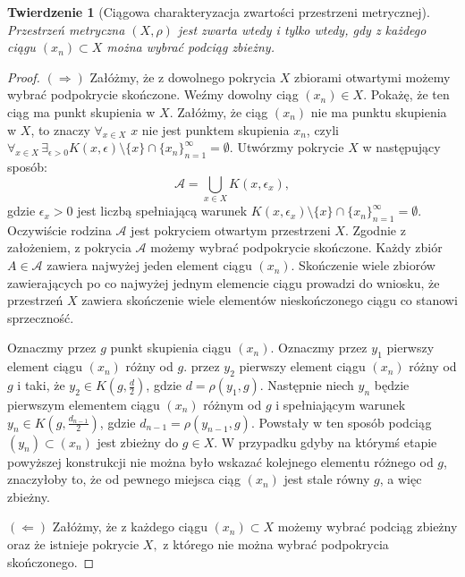\documentclass[licencjacka]{pwr_wmat_praca_dyplomowa}
\theoremstyle{plain}
\newtheorem{theorem}{Twierdzenie}
\numberwithin{theorem}{chapter}
\theoremstyle{definition}
\numberwithin{theorem}{chapter}
\begin{document}
\begin{theorem}[Ciągowa charakteryzacja zwartości przestrzeni metrycznej]
\label{rownowaznosc_definicji_pokryciowej_i_ciagowej}
Przestrzeń metryczna $(X, \rho)$ jest zwarta wtedy i tylko wtedy, gdy z każdego ciągu $(x_n) \subset X$ można wybrać podciąg zbieżny.
\end{theorem}

\begin{proof}

$(\Rightarrow)$
Załóżmy, że z dowolnego pokrycia $X$ zbiorami otwartymi możemy wybrać podpokrycie skończone. Weźmy dowolny ciąg $(x_n) \in X$. Pokażę, że ten ciąg ma punkt skupienia w $X$. Załóżmy, że ciąg $(x_n)$ nie ma punktu skupienia w $X$, to znaczy $\forall_{x \in X}$ $x$ nie jest punktem skupienia $x_n$, czyli $\forall_{x \in X} \, \exists_{\epsilon > 0}  K(x, \epsilon) \setminus \{x\} \cap \{x_n\}_{n=1}^{\infty} = \emptyset$. Utwórzmy pokrycie $X$ w następujący sposób: $$\mathcal{A} = \bigcup_{x \in X} K(x, \epsilon_x),$$ gdzie $\epsilon_x > 0$ jest liczbą spełniającą warunek $K(x, \epsilon_x) \setminus \{x\} \cap \{x_n\}_{n=1}^{\infty} = \emptyset$. Oczywiście rodzina $\mathcal{A}$ jest pokryciem otwartym przestrzeni $X$. Zgodnie z założeniem, z pokrycia $\mathcal{A}$ możemy wybrać podpokrycie skończone. Każdy zbiór $A \in \mathcal{A}$ zawiera najwyżej jeden element ciągu $(x_n)$. Skończenie wiele zbiorów zawierających po co najwyżej jednym elemencie ciągu prowadzi do wniosku, że przestrzeń $X$ zawiera skończenie wiele elementów nieskończonego ciągu co stanowi sprzeczność.

Oznaczmy przez $g$ punkt skupienia ciągu $(x_n)$. Oznaczmy przez $y_1$ pierwszy element ciągu $(x_n)$ różny od $g$. przez $y_2$ pierwszy element ciągu $(x_n)$ różny od $g$ i taki, że $y_2 \in K(g, \frac{d}{2})$, gdzie $d = \rho(y_1, g)$.
Następnie niech $y_n$ będzie pierwszym elementem ciągu $(x_n)$ różnym od $g$ i spełniającym warunek $y_n \in K(g, \frac{d_{n-1}}{2})$, gdzie $d_{n-1} = \rho(y_{n-1}, g)$. Powstały w ten sposób podciąg $(y_n) \subset (x_n)$ jest zbieżny do $g \in X$. W przypadku gdyby na którymś etapie powyższej konstrukcji nie można było wskazać kolejnego elementu różnego od $g$, znaczyłoby to, że od pewnego miejsca ciąg $(x_n)$ jest stale równy $g$, a więc zbieżny.


$(\Leftarrow)$
Załóżmy, że z każdego ciągu $(x_n) \subset X$ możemy wybrać podciąg zbieżny oraz że istnieje pokrycie $X,$ z którego nie można wybrać podpokrycia skończonego.


\end{proof}
\end{document}
